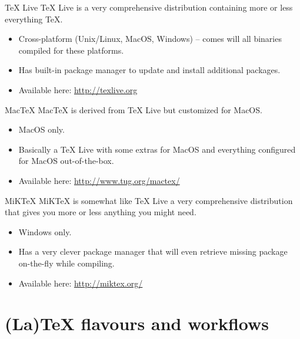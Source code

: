 \documentclass[english]{beamer}
\begin{document}

\begin{frame}{\insertsection}{TeX Live}
  TeX Live is a very comprehensive distribution containing more or
  less everything \TeX.
  \begin{itemize}
  \item Cross-platform (Unix/Linux, MacOS, Windows) -- comes will all
    binaries compiled for these platforms.
  \item Has built-in package manager to update and install additional
    packages.
  \item Available here: \url{http://texlive.org}
  \end{itemize}
\end{frame}

\begin{frame}{\insertsection}{MacTeX}
  MacTeX is derived from TeX Live but customized for MacOS.
  \begin{itemize}
  \item MacOS only.
  \item Basically a TeX Live with some extras for MacOS and everything
    configured for MacOS out-of-the-box.
  \item Available here: \url{http://www.tug.org/mactex/}
  \end{itemize}
\end{frame}

\begin{frame}{\insertsection}{MiKTeX}
  MiKTeX is somewhat like TeX Live a very comprehensive distribution
  that gives you more or less anything you might need.
  \begin{itemize}
  \item Windows only.
  \item Has a very clever package manager that will even retrieve
    missing package on-the-fly while compiling.
  \item Available here: \url{http://miktex.org/}
  \end{itemize}
\end{frame}

\section{(La)TeX flavours and workflows}

\end{document}
